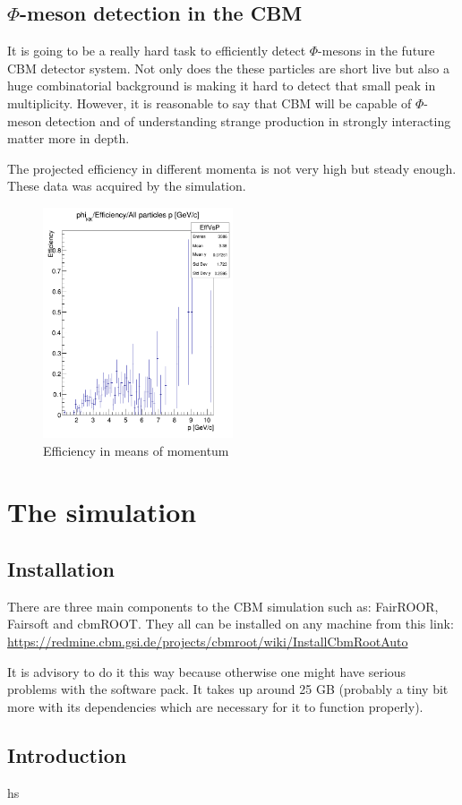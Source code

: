 \documentclass[a4paper,12pt]{article}
\begin{document}
\subsection{$\Phi$-meson detection in the CBM}
\vspace{3mm}
\par It is going to be a really hard task to efficiently detect $\Phi$-mesons in the future CBM detector system. Not only does the these particles are short live but also a huge combinatorial background is making it hard to detect that small peak in multiplicity. However, it is reasonable to say that CBM will be capable of $\Phi$-meson detection and of understanding strange production in strongly interacting matter more in depth.
\vspace{3mm}
\par The projected efficiency in different momenta is not very high but steady enough. These data was acquired by the simulation. 
\begin{figure}[H]
	\centering
	\includegraphics[width=0.5\textwidth]{efficieny.png}
	\caption{ Efficiency in means of momentum }
\end{figure}
\section{The simulation}
\vspace{3mm}
\subsection{Installation}
\vspace{3mm}
\par There are three main components to the CBM simulation such as: FairROOR, Fairsoft and cbmROOT. They all can be installed on any machine from this link:
\url{https://redmine.cbm.gsi.de/projects/cbmroot/wiki/InstallCbmRootAuto} \newline
\par It is advisory to do it this way because otherwise one might have serious problems with the software pack. It takes up around 25 GB (probably a tiny bit more with its dependencies which are necessary for it to function properly).
\subsection{Introduction}
\vspace{3mm}
\par hs
\end{document}
